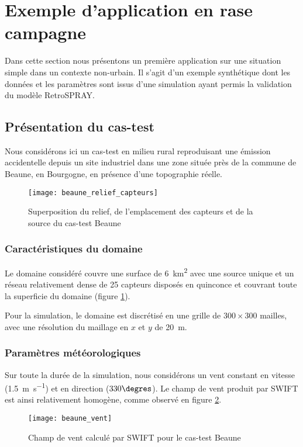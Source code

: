 \section{Exemple d'application en rase campagne}

Dans cette section nous présentons un première application sur une situation  simple dans un contexte non-urbain. Il s'agit d'un exemple synthétique dont les données et les paramètres sont issus d'une simulation ayant permis la validation du modèle RetroSPRAY.

\subsection{Présentation du cas-test}

Nous considérons ici un cas-test en milieu rural reproduisant une émission accidentelle depuis un site industriel dans une zone située près de la commune de Beaune, en Bourgogne, en présence d'une topographie réelle. 

\begin{figure}[h!]
	\centering
	\texttt{[image: beaune\_relief\_capteurs]}
	\caption{Superposition du relief, de l'emplacement des capteurs et de la source du cas-test Beaune}
	\label{fig_beaune_relief}
\end{figure}

\subsubsection{Caractéristiques du domaine}
Le domaine considéré couvre une surface de \SI{6}{\square\kilo\meter} avec une source unique et un réseau relativement dense de 25 capteurs disposés en quinconce et couvrant toute la superficie du domaine (figure \ref{fig_beaune_relief}).

Pour la simulation, le domaine est discrétisé en une grille de $300 \times 300$ mailles, avec une résolution du maillage en $x$ et $y$ de \SI{20}{\meter}.

\subsubsection{Paramètres météorologiques}
Sur toute la durée de la simulation, nous considérons un vent constant en vitesse (\SI{1.5}{\m\per\second}) et en direction ($330\degres$). Le champ de vent produit par SWIFT est ainsi relativement homogène, comme observé en figure \ref{fig_beaune_vent}.

\begin{figure}[h!]
	\centering
	\texttt{[image: beaune\_vent]}
	\caption{Champ de vent calculé par SWIFT pour le cas-test Beaune}
	\label{fig_beaune_vent}
\end{figure}


